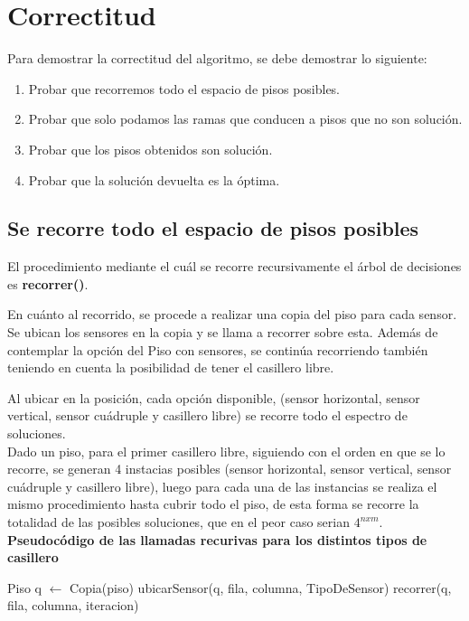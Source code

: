 \documentclass[a4paper, 10pt, twoside]{article}
\newenvironment{pseudo}[1][]{%
    \vspace{0.5em}%
    \begin{algorithmic}%
}
{%
    \end{algorithmic}%
    \vspace{0.5em}%
}
\begin{document}
\section{Correctitud}
Para demostrar la correctitud del algoritmo, se debe demostrar lo siguiente:
\begin{enumerate}
  \item Probar que recorremos todo el espacio de pisos posibles.
    \item Probar que solo podamos las ramas que conducen a pisos que no son solución.
    \item Probar que los pisos obtenidos son solución.
    \item Probar que la solución devuelta es la óptima.
\end{enumerate}

\subsection{Se recorre todo el espacio de pisos posibles}

El procedimiento mediante el cuál se recorre recursivamente el árbol de decisiones es \textbf{recorrer()}.

En cuánto al recorrido, se procede a realizar una copia del piso para cada sensor. Se ubican los sensores en la copia y se llama a recorrer sobre esta.
Además de contemplar la opción del Piso con sensores, se continúa recorriendo también teniendo en cuenta la posibilidad de tener el casillero libre.

Al ubicar en la posición, cada opción disponible, (sensor horizontal, sensor vertical, sensor cuádruple y casillero libre) se recorre todo el espectro de soluciones. \\

Dado un piso, para el primer casillero libre, siguiendo con el orden en que se lo recorre, se generan 4 instacias posibles (sensor horizontal, sensor vertical, sensor cuádruple y casillero libre), luego para cada una de las instancias se realiza el mismo procedimiento hasta cubrir todo el piso, de esta forma se recorre la totalidad de las posibles soluciones, que en el peor caso serian $4^{nxm}$.\\
\textbf{Pseudocódigo de las llamadas recurivas para los distintos tipos de casillero}

\begin{pseudo}
  \State Piso q $\leftarrow$ Copia(piso)
    \State ubicarSensor(q, fila, columna, TipoDeSensor)
  \State recorrer(q, fila, columna, iteracion)
\end{pseudo}
\end{document}
